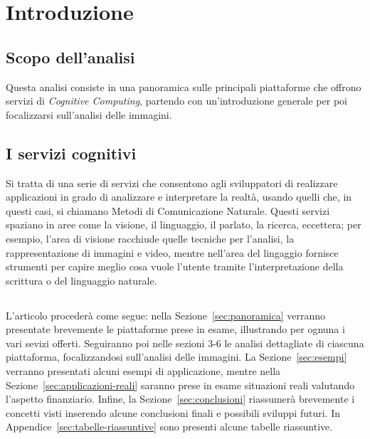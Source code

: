
\section{Introduzione}\label{sec:introduzione}
\subsection{Scopo dell'analisi}\label{subsec:scopo-analisi}
Questa analisi consiste in una panoramica sulle principali piattaforme che offrono servizi di \textit{Cognitive Computing},
partendo con un'introduzione generale per poi focalizzarsi sull'analisi delle immagini.
%
\subsection{I servizi cognitivi}\label{subsec:i-servizi-cognitivi}
Si tratta di una serie di servizi che consentono agli sviluppatori di realizzare applicazioni in grado di analizzare e interpretare la realtà,
usando quelli che, in questi casi, si chiamano Metodi di Comunicazione Naturale.
Questi servizi spaziano in aree come la visione, il linguaggio, il parlato, la ricerca, eccettera;
per esempio, l'area di visione racchiude quelle tecniche per l'analisi, la rappresentazione di immagini e video, mentre
nell'area del lingaggio fornisce strumenti per capire meglio cosa vuole l'utente tramite l'interpretazione della scrittura o del linguaggio naturale.
%
\subsection*{}
L'articolo procederà come segue: nella Sezione~\ref{sec:panoramica} verranno presentate brevemente le piattaforme prese in esame, illustrando per ognuna i vari sevizi offerti.
Seguiranno poi nelle sezioni 3-6 le analisi dettagliate di ciascuna piattaforma, focalizzandosi sull'analisi delle immagini.
La Sezione~\ref{sec:esempi} verranno presentati alcuni esempi di applicazione, mentre
nella Sezione~\ref{sec:applicazioni-reali} saranno prese in esame situazioni reali valutando l'aspetto finanziario.
Infine, la Sezione~\ref{sec:conclusioni} riassumerà brevemente i concetti visti inserendo alcune conclusioni finali e possibili sviluppi futuri.
In Appendice~\ref{sec:tabelle-riassuntive} sono presenti alcune tabelle riassuntive.
